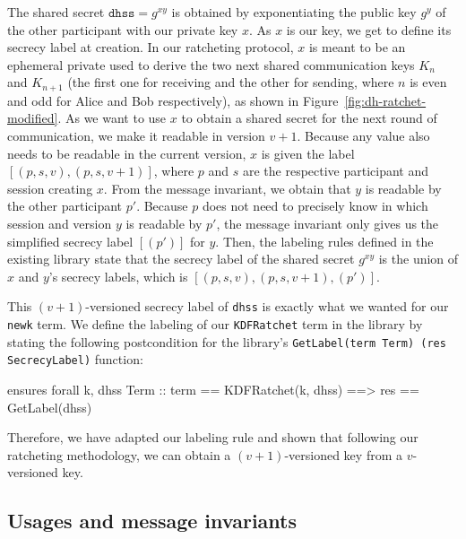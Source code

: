The shared secret $\texttt{dhss} = g^{xy}$ is obtained by exponentiating the public key $g^y$ of the other participant with our private key $x$.
As $x$ is our key, we get to define its secrecy label at creation. 
In our ratcheting protocol, $x$ is meant to be an ephemeral private used to derive the two next shared communication keys $K_n$ and $K_{n+1}$ (the first one for receiving and the other for sending, where $n$ is even and odd for Alice and Bob respectively), as shown in Figure~\ref{fig:dh-ratchet-modified}.
As we want to use $x$ to obtain a shared secret for the next round of communication, we make it readable in version $v+1$. Because any value also needs to be readable in the current version, $x$ is given the label $[(p,s,v),(p,s,v+1)]$, where $p$ and $s$ are the respective participant and session creating $x$.
From the message invariant, we obtain that $y$ is readable by the other participant $p'$. Because $p$ does not need to precisely know in which session and version $y$ is readable by $p'$, the message invariant only gives us the simplified secrecy label $[(p')]$ for $y$.
Then, the labeling rules defined in the existing library state that the secrecy label of the shared secret $g^{xy}$ is the union of $x$ and $y$'s secrecy labels, which is $[(p,s,v),(p,s,v+1),(p')]$.

This $(v+1)$-versioned secrecy label of \texttt{dhss} is exactly what we wanted for our \texttt{newk} term.
We define the labeling of our \texttt{KDFRatchet} term in the library by stating the following postcondition for the library's \texttt{GetLabel(term Term) (res SecrecyLabel)} function:
\begin{gobra}
ensures forall k, dhss Term ::
    term == KDFRatchet(k, dhss) ==> res == GetLabel(dhss)
\end{gobra}
Therefore, we have adapted our labeling rule and shown that following our ratcheting methodology, we can obtain a $(v+1)$-versioned key from a $v$-versioned key.

\subsection{Usages and message invariants}
\label{sec:usages-and-message-invariants}

